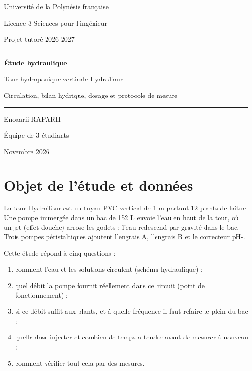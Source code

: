 \documentclass[11pt,a4paper]{article}
\begin{document}
\begin{titlepage}
\centering
\vspace*{1.5cm}
{\large Université de la Polynésie française\par}
\vspace{0.3cm}
{\large Licence 3 Sciences pour l'ingénieur\par}
\vspace{0.3cm}
{\large Projet tutoré 2026-2027\par}
\vspace{3cm}
{\color{bleuTitre}\rule{\linewidth}{1pt}\par}
\vspace{0.6cm}
{\Huge\bfseries\color{bleuTitre} Étude hydraulique\par}
\vspace{0.4cm}
{\LARGE Tour hydroponique verticale HydroTour\par}
\vspace{0.4cm}
{\large Circulation, bilan hydrique, dosage et protocole de mesure\par}
\vspace{0.6cm}
{\color{bleuTitre}\rule{\linewidth}{1pt}\par}
\vspace{3cm}
{\Large Enoaarii RAPARII\par}
\vspace{0.3cm}
{\large Équipe de 3 étudiants\par}
\vfill
{\large Novembre 2026\par}
\end{titlepage}
\setcounter{page}{2}

\tableofcontents
\newpage

\section{Objet de l'étude et données}
La tour HydroTour est un tuyau PVC vertical de 1 m portant 12 plants de laitue. Une pompe immergée dans un bac de 152 L envoie l'eau en haut de la tour, où un jet (effet douche) arrose les godets ; l'eau redescend par gravité dans le bac. Trois pompes péristaltiques ajoutent l'engrais A, l'engrais B et le correcteur pH-.

Cette étude répond à cinq questions :
\begin{enumerate}
  \item comment l'eau et les solutions circulent (schéma hydraulique) ;
  \item quel débit la pompe fournit réellement dans ce circuit (point de fonctionnement) ;
  \item si ce débit suffit aux plants, et à quelle fréquence il faut refaire le plein du bac ;
  \item quelle dose injecter et combien de temps attendre avant de mesurer à nouveau ;
  \item comment vérifier tout cela par des mesures.
\end{enumerate}
\end{document}
